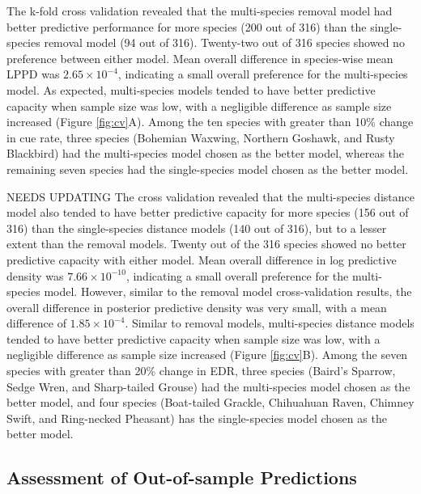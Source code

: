 \documentclass[12pt]{article}
\begin{document}
\par The k-fold cross validation revealed that the multi-species removal model had better predictive performance for more species (200 out of 316) than the single-species removal model (94 out of 316).
Twenty-two out of 316 species showed no preference between either model.
Mean overall difference in species-wise mean LPPD was $2.65 \times 10^{-4}$, indicating a small overall preference for the multi-species model.
As expected, multi-species models tended to have better predictive capacity when sample size was low, with a negligible difference as sample size increased (Figure \ref{fig:cv}A).
Among the ten species with greater than 10\% change in cue rate, three species (Bohemian Waxwing, Northern Goshawk, and Rusty Blackbird) had the multi-species model chosen as the better model, whereas the remaining seven species had the single-species model chosen as the better model.

\par NEEDS UPDATING The cross validation revealed that the multi-species distance model also tended to have better predictive capacity for more species (156 out of 316) than the single-species distance models (140 out of 316), but to a lesser extent than the removal models.
Twenty out of the 316 species showed no better predictive capacity with either model.
Mean overall difference in log predictive density was $7.66 \times 10^{-10}$, indicating a small overall preference for the multi-species model.
However, similar to the removal model cross-validation results, the overall difference in posterior predictive density was very small, with a mean difference of $1.85 \times 10^{-4}$.
Similar to removal models, multi-species distance models tended to have better predictive capacity when sample size was low, with a negligible difference as sample size increased (Figure \ref{fig:cv}B).
Among the seven species with greater than 20\% change in EDR, three species (Baird's Sparrow, Sedge Wren, and Sharp-tailed Grouse) had the multi-species model chosen as the better model, and four species (Boat-tailed Grackle, Chihuahuan Raven, Chimney Swift, and Ring-necked Pheasant) has the single-species model chosen as the better model.

\subsection{Assessment of Out-of-sample Predictions}
\end{document}

